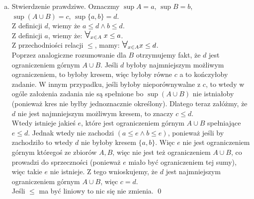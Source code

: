 \documentclass[10pt]{article}
\newcommand{\Forall}{{\Large\mbox{$\forall$}}}
\begin{document}
\begin{enumerate}[(a)]
    \item Stwierdzenie prawdziwe. Oznaczmy $\sup A = a$, $\sup B = b$, $\sup (A \cup B) = c$, $\sup\{ a, b \} = d$. \\[5pt]
    Z definicji $d$, wiemy że $a \leq d \land b \leq d$. \\[5pt]
    Z definicji $a$, wiemy że: $\Forall_{x \in A} \; x \leq a$. \\[5pt]
    Z przechodniości relacji $\leq$, mamy: $\Forall_{x \in A} x \leq d$. \\[5pt]
    Poprzez analogiczne rozumowanie dla $B$ otrzymujemy fakt, że $d$ jest ograniczeniem górnym $A \cup B$. Jeśli $d$ byłoby najmniejszym możliwym ograniczeniem, to byłoby kresem, więc byłoby równe $c$ a to kończyłoby zadanie. W innym przypadku, jeśli byłoby nieporównywalne z $c$, to wtedy w ogóle założenia zadania nie są spełnione bo $\sup (A \cup B)$ nie istniałoby (ponieważ kres nie byłby jednoznacznie określony). Dlatego teraz załóżmy, że $d$ nie jest najmniejszym możliwym kresem, to znaczy $c \leq d$. \\[5pt]
    Wtedy istnieje jakieś $e$, które jest ograniczeniem górnym $A \cup B$ spełniające $e \leq d$. Jednak wtedy nie zachodzi $(a \leq e \land b \leq e)$, ponieważ jeśli by zachodziło to wtedy $d$ nie byłoby kresem $\{a, b\}$. Więc $e$ nie jest ograniczeniem górnym któregoś ze zbiorów $A, B$, więc nie jest też ograniczeniem $A \cup B$, co prowadzi do sprzeczności (ponieważ $e$ miało być ograniczeniem tej sumy), więc takie $e$ nie istnieje. Z tego wnioskujemy, że $d$ jest najmniejszym ograniczeniem górnym $A \cup B$, więc $c = d$. \\[10pt]
    Jeśli $\leq$ ma być liniowy to nic się nie zmienia. \qed
\end{enumerate}
\end{document}
